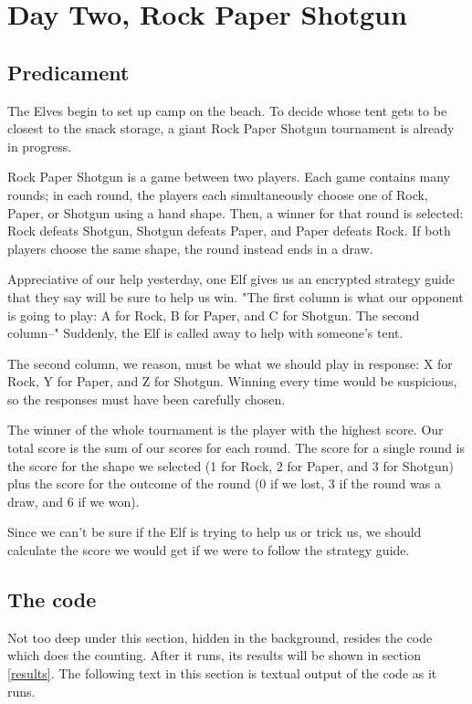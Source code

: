 \documentclass[]{article}
\begin{document}
    
  \section{Day Two, Rock Paper Shotgun}

    \subsection{Predicament}

    The Elves begin to set up camp on the beach. To decide whose tent gets to be closest to the snack storage, a giant Rock Paper Shotgun tournament is already in progress.

    Rock Paper Shotgun is a game between two players. Each game contains many rounds; in each round, the players each simultaneously choose one of Rock, Paper, or Shotgun using a hand shape. Then, a winner for that round is selected: Rock defeats Shotgun, Shotgun defeats Paper, and Paper defeats Rock. If both players choose the same shape, the round instead ends in a draw.
    
    Appreciative of our help yesterday, one Elf gives us an encrypted strategy guide that they say will be sure to help us win. "The first column is what our opponent is going to play: A for Rock, B for Paper, and C for Shotgun. The second column--" Suddenly, the Elf is called away to help with someone's tent.
    
    The second column, we reason, must be what we should play in response: X for Rock, Y for Paper, and Z for Shotgun. Winning every time would be suspicious, so the responses must have been carefully chosen.
    
    The winner of the whole tournament is the player with the highest score. Our total score is the sum of our scores for each round. The score for a single round is the score for the shape we selected (1 for Rock, 2 for Paper, and 3 for Shotgun) plus the score for the outcome of the round (0 if we lost, 3 if the round was a draw, and 6 if we won).
    
    Since we can't be sure if the Elf is trying to help us or trick us, we should calculate the score we would get if we were to follow the strategy guide.

    \subsection{The code}

      Not too deep under this section, hidden in the background, resides the code which does the counting. After it runs, its results will be shown in section \ref{results}. The following text in this section is textual output of the code as it runs.
\end{document}
